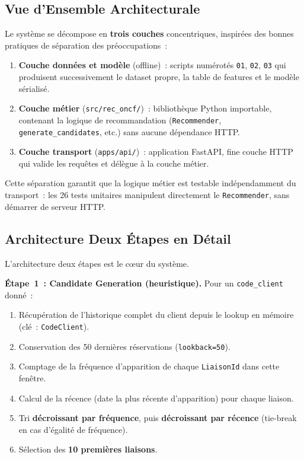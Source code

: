 \documentclass[11pt, a4paper]{article}
\begin{document}
\subsection{Vue d'Ensemble Architecturale}

Le système se décompose en \textbf{trois couches} concentriques,
inspirées des bonnes pratiques de séparation des préoccupations~:

\begin{enumerate}
\item \textbf{Couche données et modèle} (offline)~: scripts numérotés
    \texttt{01}, \texttt{02}, \texttt{03} qui produisent
    successivement le dataset propre, la table de features et le modèle
    sérialisé.
\item \textbf{Couche métier} (\texttt{src/rec\_oncf/})~: bibliothèque
    Python importable, contenant la logique de recommandation
    (\texttt{Recommender}, \texttt{generate\_candidates}, etc.) sans
    aucune dépendance HTTP.
\item \textbf{Couche transport} (\texttt{apps/api/})~: application
    FastAPI, fine couche HTTP qui valide les requêtes et délègue à la
    couche métier.
\end{enumerate}

Cette séparation garantit que la logique métier est testable
indépendamment du transport~: les 26 tests unitaires manipulent
directement le \texttt{Recommender}, sans démarrer de serveur HTTP.

\subsection{Architecture Deux Étapes en Détail}

L'architecture deux étapes est le cœur du système.

\textbf{Étape~1~: Candidate Generation (heuristique).} Pour un
\texttt{code\_client} donné~:
\begin{enumerate}
\item Récupération de l'historique complet du client depuis le lookup
    en mémoire (clé~: \texttt{CodeClient}).
\item Conservation des 50 dernières réservations
    (\texttt{lookback=50}).
\item Comptage de la fréquence d'apparition de chaque
    \texttt{LiaisonId} dans cette fenêtre.
\item Calcul de la récence (date la plus récente d'apparition) pour
    chaque liaison.
\item Tri \textbf{décroissant par fréquence}, puis \textbf{décroissant
    par récence} (tie-break en cas d'égalité de fréquence).
\item Sélection des \textbf{10 premières liaisons}.
\end{enumerate}
\end{document}
